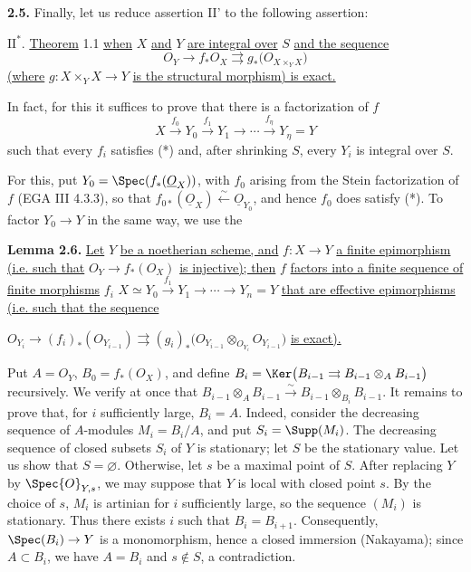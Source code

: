 \textbf{2.5.} Finally, let us reduce assertion II' to the following assertion:

\(\mathrm{II}^*\). \uline{Theorem} 1.1 \uline{when} \(X\) \uline{and} \(Y\) \uline{are integral over} \(S\) \uline{and the sequence}
\begin{equation}\tag{*}
  {O}_Y \longrightarrow f_*{O}_X \rightrightarrows g_*\bigl({O}_{X\times_YX}\bigr)
\end{equation}
\uline{(where} \(g:X\times_YX\to Y\) \uline{is the structural morphism) is exact.}

In fact, for this it suffices to prove that there is a factorization of \(f\)
\[
  X\xrightarrow{f_0}Y_0\xrightarrow{f_1}Y_1\longrightarrow\cdots\xrightarrow{f_\eta}Y_\eta=Y
\]
such that every \(f_i\) satisfies (*) and, after shrinking \(S\), every \(Y_i\) is integral over \(S\).

For this, put \(Y_0=\Spec(f_*(\underline{O}_X))\), with \(f_0\) arising from the Stein factorization of \(f\) (EGA III 4.3.3), so that \(f_{0*}(\underline{O}_X)\xleftarrow{\sim}\underline{O}_{Y_0}\), and hence \(f_0\) does satisfy (*). To factor \(Y_0\to Y\) in the same way, we use the

\textbf{Lemma 2.6.} \uline{Let} \(Y\) \uline{be a noetherian scheme, and} \(f:X\to Y\) \uline{a finite epimorphism (i.e. such that} \({O}_Y\to f_*({O}_X)\) \uline{is injective); then} \(f\) \uline{factors into a finite sequence of finite morphisms} \(f_i\) \(X\simeq Y_0\xrightarrow{f_1}Y_1\longrightarrow\cdots\longrightarrow Y_n=Y\) \uline{that are effective epimorphisms (i.e. such that the sequence}


%
\({O}_{Y_i}\longrightarrow (f_i)_*({O}_{Y_{i-1}})\rightrightarrows (g_i)_*\bigl({O}_{Y_{i-1}}\otimes_{{O}_{Y_i}}{O}_{Y_{i-1}}\bigr)\) \uline{is exact).}

Put \(A={O}_Y\), \(B_0=f_*({O}_X)\), and define \(B_i=\Ker\bigl(B_{i-1}\rightrightarrows B_{i-1}\otimes_A B_{i-1}\bigr)\) recursively. We verify at once that \(B_{i-1}\otimes_A B_{i-1}\xrightarrow{\sim}B_{i-1}\otimes_{B_i}B_{i-1}\). It remains to prove that, for \(i\) sufficiently large, \(B_i=A\). Indeed, consider the decreasing sequence of \(A\)-modules \(M_i=B_i/A\), and put \(S_i=\Supp(M_i)\). The decreasing sequence of closed subsets \(S_i\) of \(Y\) is stationary; let \(S\) be the stationary value. Let us show that \(S=\varnothing\). Otherwise, let \(s\) be a maximal point of \(S\). After replacing \(Y\) by \(\Spec{O}_{Y,s}\), we may suppose that \(Y\) is local with closed point \(s\). By the choice of \(s\), \(M_i\) is artinian for \(i\) sufficiently large, so the sequence \((M_i)\) is stationary. Thus there exists \(i\) such that \(B_i=B_{i+1}\). Consequently, \(\Spec(B_i)\to Y\) is a monomorphism, hence a closed immersion (Nakayama); since \(A\subset B_i\), we have \(A=B_i\) and \(s\notin S\), a contradiction.


